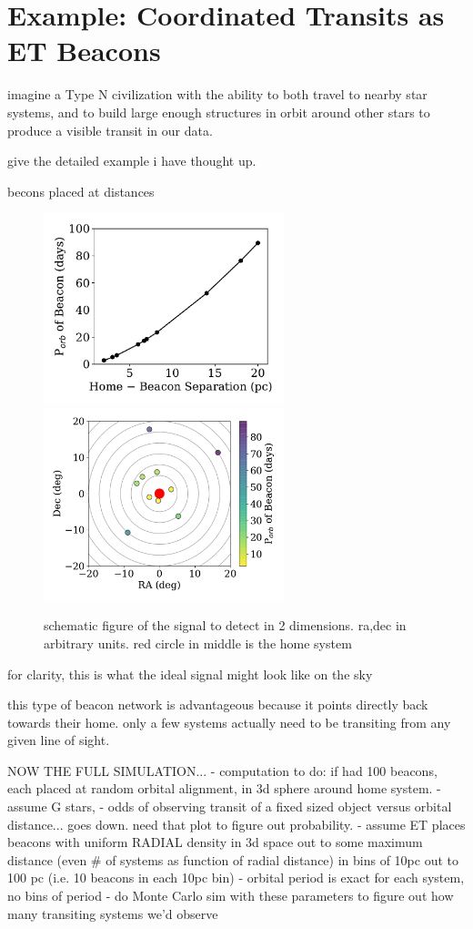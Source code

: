 \documentclass[modern]{aastex61}
\begin{document}
\section{Example: Coordinated Transits as ET Beacons}
imagine a Type N civilization with the ability to both travel to nearby star systems, and to build large enough structures in orbit around other stars to produce a visible transit in our data.

give the detailed example i have thought up.

becons placed at distances


\begin{figure}[]
\centering
\includegraphics[width=2.75in]{../figures/dist_per.pdf}
\includegraphics[width=2.75in]{../figures/sky_per.pdf}
\caption{schematic figure of the signal to detect in 2 dimensions. ra,dec in arbitrary units. red circle in middle is the home system}
\label{fig:2d}
\end{figure}


for clarity, this is what the ideal signal might look like on the sky



this type of beacon network is advantageous because it points directly back towards their home. only a few systems actually need to be transiting from any given line of sight.

NOW THE FULL SIMULATION...
- computation to do: if had 100 beacons, each placed at random orbital alignment, in 3d sphere around home system.
- assume G stars, 
- odds of observing transit of a fixed sized object versus orbital distance... goes down. need that plot to figure out probability. 
- assume ET places beacons with uniform RADIAL density in 3d space out to some maximum distance (even \# of systems as function of radial distance) in bins of 10pc out to 100 pc (i.e. 10 beacons in each 10pc bin)
- orbital period is exact for each system, no bins of period
- do Monte Carlo sim with these parameters to figure out how many transiting systems we'd observe 
\end{document}
